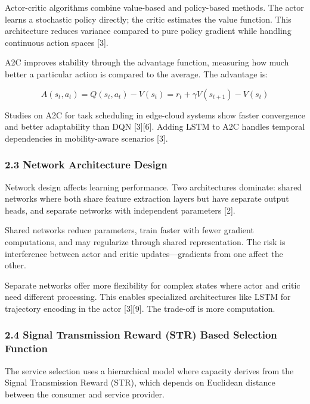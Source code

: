 \documentclass[
  10pt,
  twocolumn,
]{article}
\begin{document}
Actor-critic algorithms combine value-based and policy-based methods.
The actor learns a stochastic policy directly; the critic estimates the
value function. This architecture reduces variance compared to pure
policy gradient while handling continuous action spaces {[}3{]}.

A2C improves stability through the advantage function, measuring how
much better a particular action is compared to the average. The
advantage is:

\[A(s_t, a_t) = Q(s_t, a_t) - V(s_t) = r_t + \gamma V(s_{t+1}) - V(s_t)\]

Studies on A2C for task scheduling in edge-cloud systems show faster
convergence and better adaptability than DQN {[}3{]}{[}6{]}. Adding LSTM
to A2C handles temporal dependencies in mobility-aware scenarios
{[}3{]}.

\hypertarget{network-architecture-design}{%
	\subsubsection{2.3 Network Architecture
		Design}\label{network-architecture-design}}

Network design affects learning performance. Two architectures dominate:
shared networks where both share feature extraction layers but have
separate output heads, and separate networks with independent parameters
{[}2{]}.

Shared networks reduce parameters, train faster with fewer gradient
computations, and may regularize through shared representation. The risk
is interference between actor and critic updates---gradients from one
affect the other.

Separate networks offer more flexibility for complex states where actor
and critic need different processing. This enables specialized
architectures like LSTM for trajectory encoding in the actor
{[}3{]}{[}9{]}. The trade-off is more computation.

\hypertarget{signal-transmission-reward-str-based-selection-function}{%
	\subsubsection{2.4 Signal Transmission Reward (STR) Based Selection
		Function}\label{signal-transmission-reward-str-based-selection-function}}

The service selection uses a hierarchical model where capacity derives
from the Signal Transmission Reward (STR), which depends on Euclidean
distance between the consumer and service provider.
\end{document}
